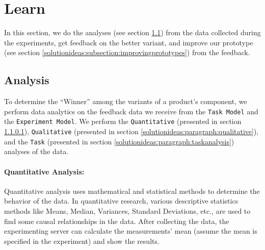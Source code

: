 \section{Learn}
\label{solutionideas:section:learn}
In this section, we do the analyses (see section \ref{solutionideas:section:dataanalysis}) from the data collected during the experiments, get feedback on the better variant, and improve our prototype (see section \ref{solutionideas:subsection:improvingprototypes}) from the feedback.
\subsection{Analysis}
\label{solutionideas:section:dataanalysis}

To determine the ``Winner'' among the variants of a product's component, we perform data analytics on the feedback data we receive from the \texttt{Task Model} and the \texttt{Experiment Model}.
We perform the \texttt{Quantitative} (presented in section \ref{solutionideas:paragraph:quantitative}), \texttt{Qualitative} (presented in section \ref{solutionideas:paragraph:qualitative}), and the \texttt{Task} (presented in section \ref{solutionideas:paragraph:taskanalysis}) analyses of the data.


\paragraph{Quantitative Analysis:}
\label{solutionideas:paragraph:quantitative}
Quantitative analysis uses mathematical and statistical methods to determine the behavior of the data.
In quantitative research, various descriptive statistics methods like Means, Median, Variances, Standard Deviations, etc., are used to find some causal relationships in the data.
After collecting the data, the experimenting server can calculate the measurements' mean (assume the mean is specified in the experiment) and show the results.


